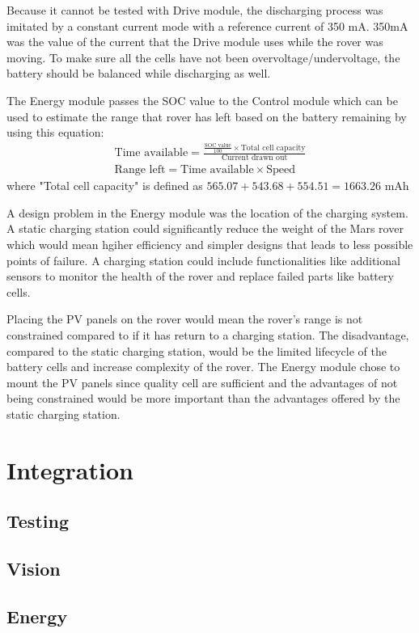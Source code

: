\documentclass[11pt, a4paper]{article}
\begin{document}
Because it cannot be tested with Drive module, the discharging process was imitated by a constant current mode with a reference current of 350 mA. 350mA was the value of the current that the Drive module uses while the rover was moving. To make sure all the cells have not been overvoltage/undervoltage, the battery should be balanced while discharging as well.

The Energy module passes the SOC value to the Control module which can be used to estimate the range that rover has left based on the battery remaining by using this equation:
\begin{gather*}
    \text{Time available} = \frac{\frac{\text{SOC value}}{100} \times \text{Total cell capacity}}{\text{Current drawn out}} \\
    \text{Range left} = \text{Time available} \times \text{Speed}
\end{gather*}
where "Total cell capacity" is defined as $565.07 + 543.68 + 554.51 = 1663.26$ mAh

A design problem in the Energy module was the location of the charging system. A static charging station could significantly reduce the weight of the Mars rover which would mean hgiher efficiency and simpler designs that leads to less possible points of failure. A charging station could include functionalities like additional sensors to monitor the health of the rover and replace failed parts like battery cells. 

Placing the PV panels on the rover would mean the rover's range is not constrained compared to if it has return to a charging station. The disadvantage, compared to the static charging station, would be the limited lifecycle of the battery cells and increase complexity of the rover. The Energy module chose to mount the PV panels since quality cell are sufficient and the advantages of not being constrained would be more important than the advantages offered by the static charging station.



\pagebreak
\section{Integration}

\subsection{Testing}

\subsection{Vision}

\subsection{Energy}







\pagebreak
\printbibliography[heading=bibnumbered, title={References}]
\end{document}
